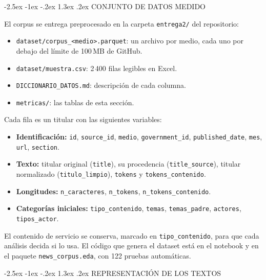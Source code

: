 \documentclass[10pt,twocolumn]{article}
\makeatletter
\renewcommand{\section}{\@startsection{section}{1}{\z@}%
  {-2.5ex \@plus -1ex \@minus -.2ex}%
  {1.3ex \@plus .2ex}%
  {\normalfont\large\bfseries\centering}}
\makeatother
\begin{document}
\section{CONJUNTO DE DATOS MEDIDO}

El corpus se entrega preprocesado en la carpeta \texttt{entrega2/} del
repositorio:

\begin{itemize}
\item \texttt{dataset/corpus\_<medio>.parquet}: un archivo por medio, cada uno
por debajo del límite de 100\,MB de GitHub.
\item \texttt{dataset/muestra.csv}: 2\,400 filas legibles en Excel.
\item \texttt{DICCIONARIO\_DATOS.md}: descripción de cada columna.
\item \texttt{metricas/}: las tablas de esta sección.
\end{itemize}

Cada fila es un titular con las siguientes variables:

\begin{itemize}
\item \textbf{Identificación:} \texttt{id}, \texttt{source\_id}, \texttt{medio},
\texttt{government\_id}, \texttt{published\_date}, \texttt{mes}, \texttt{url},
\texttt{section}.
\item \textbf{Texto:} titular original (\texttt{title}), su procedencia
(\texttt{title\_source}), titular normalizado (\texttt{titulo\_limpio}),
\texttt{tokens} y \texttt{tokens\_contenido}.
\item \textbf{Longitudes:} \texttt{n\_caracteres}, \texttt{n\_tokens},
\texttt{n\_tokens\_contenido}.
\item \textbf{Categorías iniciales:} \texttt{tipo\_contenido}, \texttt{temas},
\texttt{temas\_padre}, \texttt{actores}, \texttt{tipos\_actor}.
\end{itemize}

El contenido de servicio se conserva, marcado en \texttt{tipo\_contenido}, para
que cada análisis decida si lo usa. El código que genera el dataset está en el
notebook 
y en el paquete \texttt{news\_corpus.eda}, con 122 pruebas automáticas.

\section{REPRESENTACIÓN DE LOS TEXTOS}
\end{document}

